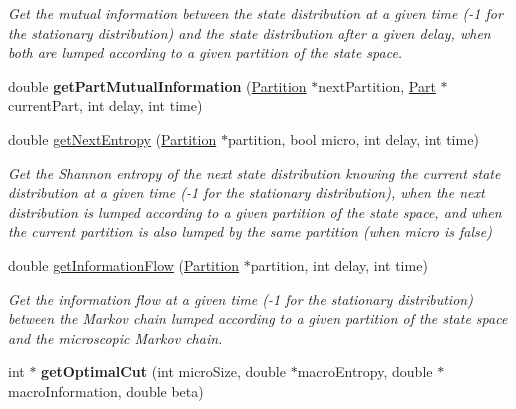 \begin{DoxyCompactItemize}
\begin{DoxyCompactList}\small\item\em Get the mutual information between the state distribution at a given time (-\/1 for the stationary distribution) and the state distribution after a given delay, when both are lumped according to a given partition of the state space. \end{DoxyCompactList}\item 
\hypertarget{class_markov_process_ac0be13af14b988f167b4f89f313603af}{double {\bfseries get\-Part\-Mutual\-Information} (\hyperlink{class_partition}{Partition} $\ast$next\-Partition, \hyperlink{class_part}{Part} $\ast$current\-Part, int delay, int time)}\label{class_markov_process_ac0be13af14b988f167b4f89f313603af}

\item 
\hypertarget{class_markov_process_a44e748cd2a12c20ec65e4d2c1975518f}{double \hyperlink{class_markov_process_a44e748cd2a12c20ec65e4d2c1975518f}{get\-Next\-Entropy} (\hyperlink{class_partition}{Partition} $\ast$partition, bool micro, int delay, int time)}\label{class_markov_process_a44e748cd2a12c20ec65e4d2c1975518f}

\begin{DoxyCompactList}\small\item\em Get the Shannon entropy of the next state distribution knowing the current state distribution at a given time (-\/1 for the stationary distribution), when the next distribution is lumped according to a given partition of the state space, and when the current partition is also lumped by the same partition (when micro is false) \end{DoxyCompactList}\item 
\hypertarget{class_markov_process_aec53ead60326b0b92d46fe20ad393036}{double \hyperlink{class_markov_process_aec53ead60326b0b92d46fe20ad393036}{get\-Information\-Flow} (\hyperlink{class_partition}{Partition} $\ast$partition, int delay, int time)}\label{class_markov_process_aec53ead60326b0b92d46fe20ad393036}

\begin{DoxyCompactList}\small\item\em Get the information flow at a given time (-\/1 for the stationary distribution) between the Markov chain lumped according to a given partition of the state space and the microscopic Markov chain. \end{DoxyCompactList}\item 
\hypertarget{class_markov_process_a4c8d809c49857400b349016e21aa71b7}{int $\ast$ {\bfseries get\-Optimal\-Cut} (int micro\-Size, double $\ast$macro\-Entropy, double $\ast$macro\-Information, double beta)}\label{class_markov_process_a4c8d809c49857400b349016e21aa71b7}


\end{DoxyCompactItemize}
